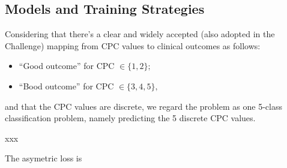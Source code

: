 \subsection{Models and Training Strategies}
\label{subsec:models}

Considering that there's a clear and widely accepted (also adopted in the Challenge) mapping from CPC values to clinical outcomes as follows:
\begin{itemize}
    \item ``Good outcome'' for CPC $\in \{1, 2\};$
    \item ``Bood outcome'' for CPC $\in \{3, 4, 5\},$
\end{itemize}
and that the CPC values are discrete, we regard the problem as one 5-class classification problem, namely predicting the 5 discrete CPC values.

xxx

The asymetric loss \cite{ridnik2021asymmetric_loss} is
